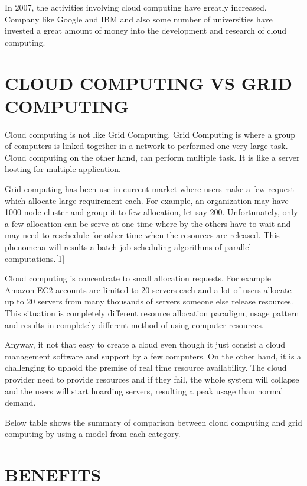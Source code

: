 \documentclass[conference, compsoc]{IEEEtran}
\begin{document}
In 2007, the activities involving cloud computing have greatly increased. Company like Google and IBM and also some number of universities have invested a great amount of money into the development and research of cloud computing.

\vspace{.5cm}	

\section{CLOUD COMPUTING VS GRID COMPUTING}
Cloud computing is not like Grid Computing. Grid Computing is where a group of computers is linked together in a network to performed one very large task. Cloud computing on the other hand, can perform multiple task. It is like a server hosting for multiple application. 

Grid computing has been use in current market where users make a few request which allocate large requirement each. For example, an organization may have 1000  node cluster and group it to few allocation, let say 200.  Unfortunately, only a few allocation can be serve at one time where by the others have to wait and may need to reschedule for other time when the resources are released. This phenomena will results a batch job scheduling algorithms of parallel computations.[1]

Cloud computing is concentrate to small allocation requests. For example Amazon EC2 accounts are limited to 20 servers each and a lot of users allocate up to 20 servers from many thousands of servers someone else release resources. This situation is completely different resource allocation paradigm, usage pattern and results in completely different method of using computer resources. 

Anyway, it not that easy to create a cloud even though it just consist a cloud management software and support by a few computers. On the other hand, it is a challenging to uphold the premise of real time resource availability. The cloud provider need to provide resources and if they fail, the whole system will collapse and the users will start hoarding servers, resulting a peak usage than normal demand.

Below table shows the summary of comparison between cloud computing and grid computing by using a model from each category.

\section{BENEFITS}
\end{document}

